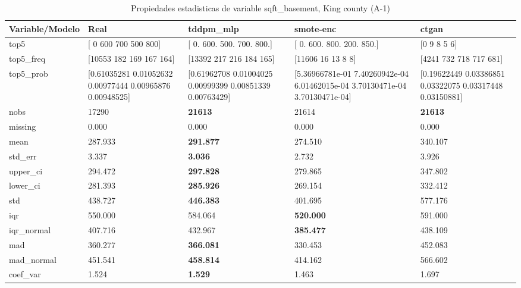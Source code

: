 \begin{table}[H]
\centering
\fontsize{8}{14}\selectfont
\caption{Propiedades  estadisticas de variable sqft\_basement, King county (A-1)}
\label{table-stats-king county-a-1-sqft_basement}
\begin{tabular}{|l|m{10em}|m{10em}|m{10em}|m{10em}|}
\hline
 \rowcolor[gray]{0.8}
Variable/Modelo & Real & tddpm\_mlp & smote-enc & ctgan \\
\hline top5 & [  0 600 700 500 800] & [  0. 600. 500. 700. 800.] & [  0. 600. 800. 200. 850.] & [0 9 8 5 6] \\
\hline top5\_freq & [10553   182   169   167   164] & [13392   217   216   184   165] & [11606    16    13     8     8] & [4241  732  718  717  681] \\
\hline top5\_prob & [0.61035281 0.01052632 0.00977444 0.00965876 0.00948525] & [0.61962708 0.01004025 0.00999399 0.00851339 0.00763429] & [5.36966781e-01 7.40260942e-04 6.01462015e-04 3.70130471e-04
 3.70130471e-04] & [0.19622449 0.03386851 0.03322075 0.03317448 0.03150881] \\
\hline nobs & 17290 & \bfseries 21613 & \cellcolor[rgb]{0.9, 0.54, 0.52} 21614 & \bfseries 21613 \\
\hline missing & 0.000 & 0.000 & 0.000 & 0.000 \\
\hline mean & 287.933 & \bfseries 291.877 & 274.510 & \cellcolor[rgb]{0.9, 0.54, 0.52} 340.107 \\
\hline std\_err & 3.337 & \bfseries 3.036 & \cellcolor[rgb]{0.9, 0.54, 0.52} 2.732 & 3.926 \\
\hline upper\_ci & 294.472 & \bfseries 297.828 & 279.865 & \cellcolor[rgb]{0.9, 0.54, 0.52} 347.802 \\
\hline lower\_ci & 281.393 & \bfseries 285.926 & 269.154 & \cellcolor[rgb]{0.9, 0.54, 0.52} 332.412 \\
\hline std & 438.727 & \bfseries 446.383 & 401.695 & \cellcolor[rgb]{0.9, 0.54, 0.52} 577.176 \\
\hline iqr & 550.000 & 584.064 & \bfseries 520.000 & \cellcolor[rgb]{0.9, 0.54, 0.52} 591.000 \\
\hline iqr\_normal & 407.716 & 432.967 & \bfseries 385.477 & \cellcolor[rgb]{0.9, 0.54, 0.52} 438.109 \\
\hline mad & 360.277 & \bfseries 366.081 & 330.453 & \cellcolor[rgb]{0.9, 0.54, 0.52} 452.083 \\
\hline mad\_normal & 451.541 & \bfseries 458.814 & 414.162 & \cellcolor[rgb]{0.9, 0.54, 0.52} 566.602 \\
\hline coef\_var & 1.524 & \bfseries 1.529 & 1.463 & \cellcolor[rgb]{0.9, 0.54, 0.52} 1.697 \\

\end{tabular}
\end{table}
